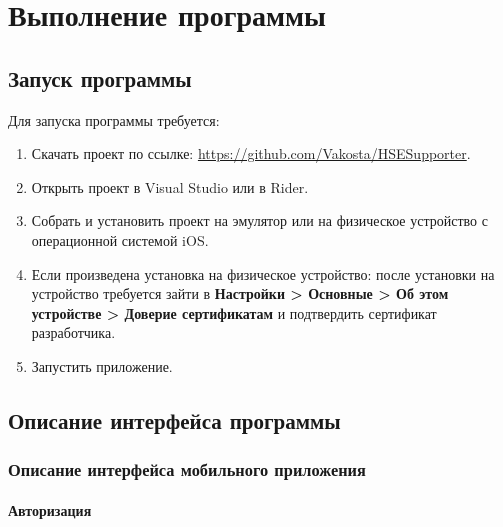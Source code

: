 \documentclass{../includes/TechDoc}
\begin{document}
    \section{Выполнение программы}

    \subsection{Запуск программы}

    Для запуска программы требуется:
    \begin{enumerate}
        \item Скачать проект по ссылке: \url{https://github.com/Vakosta/HSESupporter}.
        \item Открыть проект в Visual Studio или в Rider.
        \item Собрать и установить проект на эмулятор или на физическое устройство с операционной системой iOS.
        \item Если произведена установка на физическое устройство: после установки на устройство требуется зайти в
        \textbf{Настройки > Основные > Об этом устройстве > Доверие сертификатам} и подтвердить сертификат разработчика.
        \item Запустить приложение.
    \end{enumerate}

    \clearpage

    \subsection{Описание интерфейса программы}

    \subsubsection{Описание интерфейса мобильного приложения}

    \paragraph{Авторизация}
\end{document}
